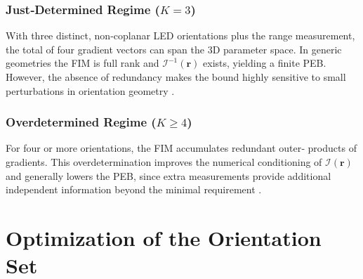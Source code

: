 \documentclass[journal]{IEEEtran}
\begin{document}
\subsubsection{Just‐Determined Regime (\(K=3\))}
With three distinct, non‐coplanar LED orientations plus the range
measurement, the total of four gradient vectors can span the
3D parameter space.  In generic geometries the FIM is
full rank and \(\mathcal{I}^{-1}(\mathbf r)\) exists, yielding a finite
PEB.  However, the absence of redundancy makes the bound highly
sensitive to small perturbations in orientation geometry
\cite{Chen2021}.

\subsubsection{Overdetermined Regime (\(K\ge4\))}
For four or more orientations, the FIM accumulates redundant outer‐
products of gradients.  This overdetermination improves the numerical
conditioning of \(\mathcal{I}(\mathbf r)\) and generally lowers the PEB,
since extra measurements provide additional independent information
beyond the minimal requirement \cite{Ma2024,Wang2024b}. 


\section{Optimization of the Orientation Set}
\label{sec:optimization}
\end{document}
